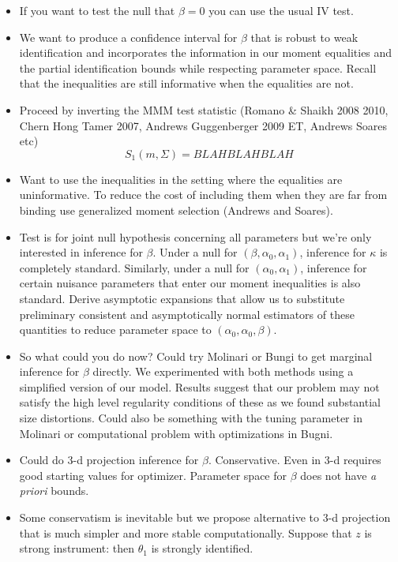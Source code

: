 \begin{itemize}
  \item If you want to test the null that $\beta = 0$ you can use the usual IV test.
  \item We want to produce a confidence interval for $\beta$ that is robust to weak identification and incorporates the information in our moment equalities and the partial identification bounds while respecting parameter space.
    Recall that the inequalities are still informative when the equalities are not.
  \item Proceed by inverting the MMM test statistic (Romano \& Shaikh 2008 2010, Chern Hong Tamer 2007, Andrews Guggenberger 2009 ET, Andrews Soares etc) 
    \[
     S_1(m,\Sigma) = BLAHBLAHBLAH
    \]
  \item Want to use the inequalities in the setting where the equalities are uninformative.
    To reduce the cost of including them when they are far from binding use generalized moment selection (Andrews and Soares).
  \item Test is for joint null hypothesis concerning all parameters but we're only interested in inference for $\beta$.
    Under a null for $(\beta, \alpha_0, \alpha_1)$, inference for $\kappa$ is completely standard.
    Similarly, under a null for $(\alpha_0, \alpha_1)$, inference for certain nuisance parameters that enter our moment inequalities is also standard.
    Derive asymptotic expansions that allow us to substitute preliminary consistent and asymptotically normal estimators of these quantities to reduce parameter space to $(\alpha_0, \alpha_0, \beta)$.
  \item So what could you do now? Could try Molinari or Bungi to get marginal inference for $\beta$ directly.
    We experimented with both methods using a simplified version of our model.
    Results suggest that our problem may not satisfy the high level regularity conditions of these as we found substantial size distortions. 
    Could also be something with the tuning parameter in Molinari or computational problem with optimizations in Bugni.
  \item Could do 3-d projection inference for $\beta$.
    Conservative.
    Even in 3-d requires good starting values for optimizer. 
    Parameter space for $\beta$ does not have \emph{a priori} bounds.
  \item Some conservatism is inevitable but we propose alternative to 3-d projection that is much simpler and more stable computationally.
    Suppose that $z$ is strong instrument: then $\theta_1$ is strongly identified.

\end{itemize}

